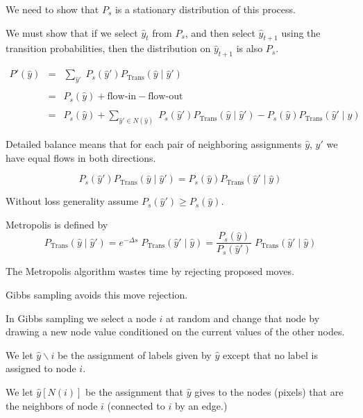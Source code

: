{
We need to show that $P_s$ is a stationary distribution of this process.

\vfill
We must show that if we select $\hat{y}_t$ from $P_s$, and then select $\hat{y}_{t+1}$ using the transition probabilities,
then the distribution on $\hat{y}_{t+1}$ is also $P_s$.


\begin{eqnarray*}
P'(\hat{y}) & = & \sum_{\hat{y}'}\;P_s(\hat{y}')P_{\mathrm{Trans}}(\hat{y}\;|\;\hat{y}') \\
\\
& = & P_s(\hat{y}) + \mbox{flow-in} - \mbox{flow-out} \\
\\
& = & P_s(\hat{y}) + \sum_{\hat{y}' \in N(\hat{y})}\;P_s(\hat{y}'){P_{\mathrm{Trans}}(\hat{y}\;|\;\hat{y}')}
- P_s(\hat{y}){P_{\mathrm{Trans}}(\hat{y}'\;|\;\hat{y})}
\end{eqnarray*}



Detailed balance means that for each pair of neighboring assignments $\hat{y}$, $\hat{y}'$ we have equal flows in both directions.

\vfill
$$P_s(\hat{y}')P_{\mathrm{Trans}}(\hat{y}\;|\;\hat{y}') = P_s(\hat{y})P_{\mathrm{Trans}}(\hat{y}'\;|\;\hat{y})$$

\vfill
Without loss generality assume $P_s(\hat{y}') \geq P_s(\hat{y})$.

\vfill
Metropolis is defined by
$$P_{\mathrm{Trans}}(\hat{y}\;|\;\hat{y}') = e^{-\Delta s}\;P_{\mathrm{Trans}}(\hat{y}'\;|\;\hat{y}) = \frac{P_s(\hat{y})}{P_s(\hat{y}')}\;P_{\mathrm{Trans}}(\hat{y}'\;|\;\hat{y})$$


The Metropolis algorithm wastes time by rejecting proposed moves.

\vfill
Gibbs sampling avoids this move rejection.

\vfill
In Gibbs sampling we select a node $i$ at random and change that node by drawing a new node value conditioned on the current values of the other nodes.

\vfill
We let {\color{red} $\hat{y} \backslash i$} be the assignment of labels given by $\hat{y}$ except that no label is assigned to node $i$.

\vfill
We let {\color{red} $\hat{y}[N(i)]$} be the assignment that $\hat{y}$ gives to the nodes (pixels) that are the neighbors of node $i$ (connected to $i$ by an edge.)

}
